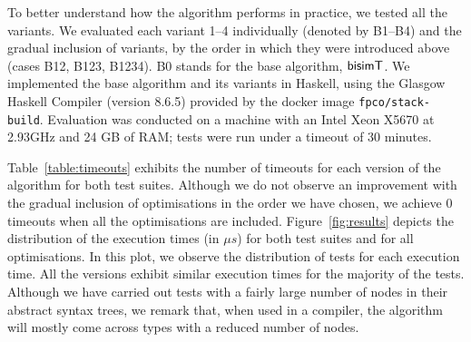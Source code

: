 To better understand how the algorithm performs in practice, we tested
all the variants. We evaluated each variant 1--4 individually (denoted
by B1--B4) and the gradual inclusion of variants, by the
order in which they were introduced above (cases B12, B123, B1234).
B0 stands for the base algorithm, $\mathsf{bisimT}$.
%
  We implemented the base algorithm and its
  variants %
  in Haskell, using the Glasgow Haskell Compiler (version 8.6.5)
  provided by the docker image \texttt{fpco/stack-build}. %
  Evaluation was conducted on a machine with an Intel Xeon X5670 at
  2.93GHz and 24 GB of RAM; tests were run under a timeout of 30
  minutes.

Table~\ref{table:timeouts} 
exhibits the number of timeouts for each version of the algorithm for both
test suites. 
Although we do not observe an improvement with the gradual
inclusion of optimisations in the order we have chosen,
we achieve 0 timeouts when all the optimisations are included.
%
%
%
Figure~\ref{fig:results} depicts the distribution of the execution
times (in $\mu s$) for both test suites and for all optimisations.  In
this plot, we observe the distribution of tests for each execution
time.  All the versions exhibit similar execution times for the
majority of the tests.  Although we have carried out tests with a
fairly large number of nodes in their abstract syntax trees, we remark
that, when used in a compiler, the algorithm will mostly come across
types with a reduced number of nodes.

